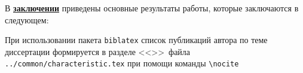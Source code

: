 В \underline{\textbf{заключении}} приведены основные результаты работы, которые заключаются в следующем:



При использовании пакета \verb!biblatex! список публикаций автора по теме
диссертации формируется в разделе <<\publications>>\ файла
\verb!../common/characteristic.tex!  при помощи команды \verb!\nocite! 


